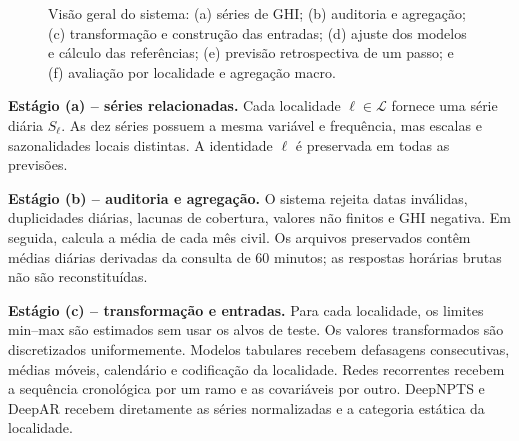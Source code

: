 \documentclass[10pt,conference,a4paper]{IEEEtran}
\begin{document}
\begin{figure}[!t]
{%
}
\caption{Visão geral do sistema: (a) séries de GHI; (b) auditoria e
agregação; (c) transformação e construção das entradas; (d) ajuste dos modelos
e cálculo das referências; (e) previsão retrospectiva de um passo; e
(f) avaliação por localidade e agregação macro.}
\label{fig:sistema}
\end{figure}

\noindent\textbf{Estágio (a) -- séries relacionadas.} Cada localidade
$\ell\in\mathcal L$ fornece uma série diária $S_\ell$. As dez séries possuem a
mesma variável e frequência, mas escalas e sazonalidades locais distintas. A
identidade $\ell$ é preservada em todas as previsões.

\noindent\textbf{Estágio (b) -- auditoria e agregação.} O sistema rejeita datas
inválidas, duplicidades diárias, lacunas de cobertura, valores não finitos e
GHI negativa. Em seguida, calcula a média de cada mês civil. Os arquivos
preservados contêm médias diárias derivadas da consulta de 60 minutos; as
respostas horárias brutas não são reconstituídas.

\noindent\textbf{Estágio (c) -- transformação e entradas.} Para cada
localidade, os limites min--max são estimados sem usar os alvos de teste. Os
valores transformados são discretizados uniformemente. Modelos tabulares
recebem defasagens consecutivas, médias móveis, calendário e codificação da
localidade. Redes recorrentes recebem a sequência cronológica por um ramo e as
covariáveis por outro. DeepNPTS e DeepAR recebem diretamente as séries
normalizadas e a categoria estática da localidade.
\end{document}
